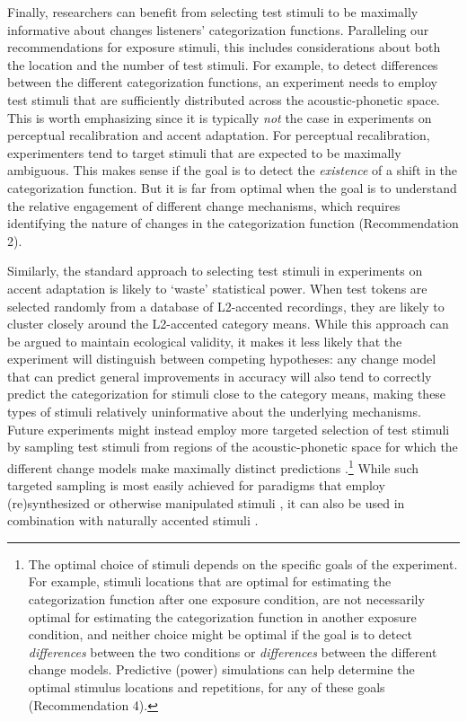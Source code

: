 \documentclass[
  11pt,
  man,floatsintext]{apa6}
\begin{document}
Finally, researchers can benefit from selecting test stimuli to be maximally informative about changes listeners' categorization functions. Paralleling our recommendations for exposure stimuli, this includes considerations about both the location and the number of test stimuli. For example, to detect differences between the different categorization functions, an experiment needs to employ test stimuli that are sufficiently distributed across the acoustic-phonetic space. This is worth emphasizing since it is typically \emph{not} the case in experiments on perceptual recalibration and accent adaptation. For perceptual recalibration, experimenters tend to target stimuli that are expected to be maximally ambiguous. This makes sense if the goal is to detect the \emph{existence} of a shift in the categorization function. But it is far from optimal when the goal is to understand the relative engagement of different change mechanisms, which requires identifying the nature of changes in the categorization function (Recommendation 2).

Similarly, the standard approach to selecting test stimuli in experiments on accent adaptation is likely to `waste' statistical power. When test tokens are selected randomly from a database of L2-accented recordings, they are likely to cluster closely around the L2-accented category means. While this approach can be argued to maintain ecological validity, it makes it less likely that the experiment will distinguish between competing hypotheses: any change model that can predict general improvements in accuracy will also tend to correctly predict the categorization for stimuli close to the category means, making these types of stimuli relatively uninformative about the underlying mechanisms. Future experiments might instead employ more targeted selection of test stimuli by sampling test stimuli from regions of the acoustic-phonetic space for which the different change models make maximally distinct predictions \autocite[for initial efforts, see][]{burchill-jaeger2022}.\footnote{The optimal choice of stimuli depends on the specific goals of the experiment. For example, stimuli locations that are optimal for estimating the categorization function after one exposure condition, are not necessarily optimal for estimating the categorization function in another exposure condition, and neither choice might be optimal if the goal is to detect \emph{differences} between the two conditions or \emph{differences} between the different change models. Predictive (power) simulations can help determine the optimal stimulus locations and repetitions, for any of these goals (Recommendation 4).} While such targeted sampling is most easily achieved for paradigms that employ (re)synthesized or otherwise manipulated stimuli \autocites[for examples, see][]{bejjanki2011,burchill-jaeger2022,idemaru-holt2020}, it can also be used in combination with naturally accented stimuli \autocite[see][]{chodroff-wilson2020}.
\end{document}
